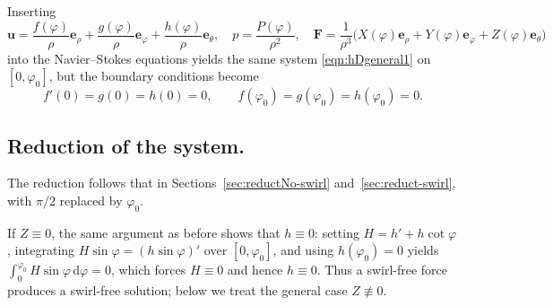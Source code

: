 \documentclass{amsart}
\newcommand{\Bu}{{\boldsymbol{u}}}
\newcommand{\Be}{{\boldsymbol{e}}}
\newcommand{\BF}{{\boldsymbol{F}}}
\begin{document}
Inserting
\[
\Bu = \frac{f(\varphi)}{\rho}\Be_\rho + \frac{g(\varphi)}{\rho}\Be_\varphi + \frac{h(\varphi)}{\rho}\Be_\theta,\quad
p = \frac{P(\varphi)}{\rho^2},\quad
\BF = \frac{1}{\rho^3}\bigl(X(\varphi)\Be_\rho + Y(\varphi)\Be_\varphi + Z(\varphi)\Be_\theta\bigr)
\]
into the Navier--Stokes equations yields the same system \eqref{eqn:hDgeneral1} on $[0,\varphi_0]$, but the boundary conditions become
\begin{equation}\label{eqn:coneBC}
f'(0)=g(0)=h(0)=0,\qquad
f(\varphi_0)=g(\varphi_0)=h(\varphi_0)=0.
\end{equation}


\subsection{Reduction of the system.}

The reduction follows that in Sections~\ref{sec:reductNo-swirl} and~\ref{sec:reduct-swirl}, with $\pi/2$ replaced by $\varphi_0$.

If $Z\equiv0$, the same argument as before shows that $h\equiv0$: setting $H=h'+h\cot\varphi$, integrating $H\sin\varphi=(h\sin\varphi)'$ over $[0,\varphi_0]$, and using $h(\varphi_0)=0$ yields $\int_0^{\varphi_0} H\sin\varphi\,\mathrm{d}\varphi=0$, which forces $H\equiv0$ and hence $h\equiv0$.  Thus a swirl-free force produces a swirl-free solution; below we treat the general case $Z\not\equiv0$.
\end{document}

